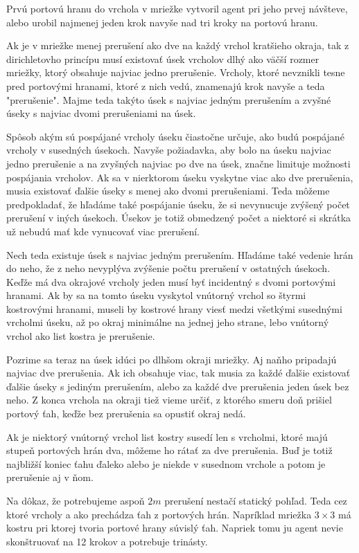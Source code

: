 Prvú portovú hranu do vrchola v mriežke vytvoril agent pri jeho prvej
návšteve, alebo urobil najmenej jeden krok navyše nad tri kroky na portovú
hranu.

Ak je v mriežke menej prerušení ako dve na každý vrchol kratšieho okraja,
tak z dirichletovho princípu musí existovať úsek vrcholov dlhý ako väčší
rozmer mriežky, ktorý obsahuje najviac jedno prerušenie.
Vrcholy, ktoré nevznikli tesne pred portovými hranami, ktoré z nich vedú,
znamenajú krok navyše a teda "prerušenie". Majme teda takýto úsek s najviac
jedným prerušením a zvyšné úseky s najviac dvomi prerušeniami na úsek.

Spôsob akým sú pospájané vrcholy úseku čiastočne určuje, ako budú pospájané
vrcholy v susedných úsekoch. Navyše požiadavka, aby bolo na úseku najviac
jedno prerušenie a na zvyšných najviac po dve na úsek, značne limituje
možnosti pospájania vrcholov.
Ak sa v nierktorom úseku vyskytne viac ako dve prerušenia, musia existovať
ďalšie úseky s menej ako dvomi prerušeniami. Teda môžeme predpokladať, že
hľadáme také pospájanie úseku, že si nevynucuje zvýšený počet prerušení v
iných úsekoch. Úsekov je totiž obmedzený počet a niektoré si skrátka už
nebudú mať kde vynucovať viac prerušení.

Nech teda existuje úsek s najviac jedným prerušením. Hľadáme také vedenie
hrán do neho, že z neho nevyplýva zvýšenie počtu prerušení v ostatných
úsekoch. Keďže má dva okrajové vrcholy jeden musí byť incidentný s dvomi
portovými hranami. Ak by sa na tomto úseku vyskytol vnútorný vrchol so
štyrmi kostrovými hranami, museli by kostrové hrany viesť medzi všetkými
susednými vrcholmi úseku, až po okraj minimálne na jednej jeho strane, lebo
vnútorný vrchol ako list kostra je prerušenie.

Pozrime sa teraz na úsek idúci po dlhšom okraji mriežky. Aj naňho pripadajú
najviac dve prerušenia. Ak ich obsahuje viac, tak musia za každé ďalšie
existovať ďalšie úseky s jediným prerušením, alebo za každé dve prerušenia
jeden úsek bez neho. Z konca vrchola na okraji tiež vieme určiť, z ktorého
smeru doň prišiel portový ťah, keďže bez prerušenia sa opustiť okraj nedá.

Ak je niektorý vnútorný vrchol list kostry susedí len s vrcholmi, 
ktoré majú stupeň portových hrán dva, môžeme
ho rátať za dve prerušenia. Buď je totiž najbližší koniec ťahu ďaleko alebo
je niekde v  susednom vrchole a potom je prerušenie aj v ňom.

Na dôkaz, že potrebujeme aspoň $2m$ prerušení nestačí statický pohľad. Teda
cez ktoré vrcholy a ako prechádza ťah z portových hrán. Napríklad mriežka $3
\times 3$ má kostru pri ktorej tvoria portové hrany súvislý ťah. Napriek
tomu ju agent nevie skonštruovať na 12 krokov a potrebuje trinásty.

